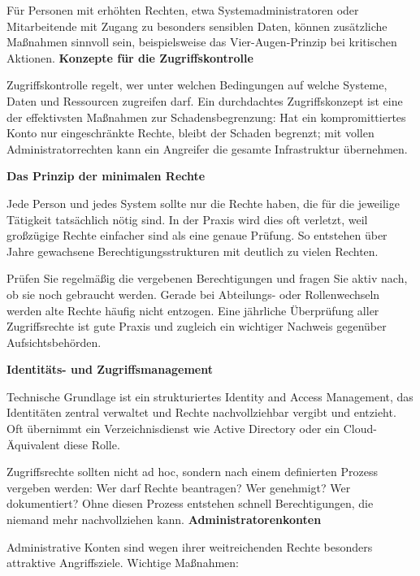 Für Personen mit erhöhten Rechten, etwa Systemadministratoren oder Mitarbeitende mit Zugang zu besonders sensiblen Daten, können zusätzliche Maßnahmen sinnvoll sein, beispielsweise das Vier-Augen-Prinzip bei kritischen Aktionen.
\newpage
\textbf{Konzepte für die Zugriffskontrolle}

Zugriffskontrolle regelt, wer unter welchen Bedingungen auf welche Systeme, Daten und Ressourcen zugreifen darf. Ein durchdachtes Zugriffskonzept ist eine der effektivsten Maßnahmen zur Schadensbegrenzung: Hat ein kompromittiertes Konto nur eingeschränkte Rechte, bleibt der Schaden begrenzt; mit vollen Administratorrechten kann ein Angreifer die gesamte Infrastruktur übernehmen.

\textbf{Das Prinzip der minimalen Rechte}

Jede Person und jedes System sollte nur die Rechte haben, die für die jeweilige Tätigkeit tatsächlich nötig sind. In der Praxis wird dies oft verletzt, weil großzügige Rechte einfacher sind als eine genaue Prüfung. So entstehen über Jahre gewachsene Berechtigungsstrukturen mit deutlich zu vielen Rechten.

Prüfen Sie regelmäßig die vergebenen Berechtigungen und fragen Sie aktiv nach, ob sie noch gebraucht werden. Gerade bei Abteilungs- oder Rollenwechseln werden alte Rechte häufig nicht entzogen. Eine jährliche Überprüfung aller Zugriffsrechte ist gute Praxis und zugleich ein wichtiger Nachweis gegenüber Aufsichtsbehörden.

\textbf{Identitäts- und Zugriffsmanagement}

Technische Grundlage ist ein strukturiertes Identity and Access Management, das Identitäten zentral verwaltet und Rechte nachvollziehbar vergibt und entzieht. Oft übernimmt ein Verzeichnisdienst wie Active Directory oder ein Cloud-Äquivalent diese Rolle.

Zugriffsrechte sollten nicht ad hoc, sondern nach einem definierten Prozess vergeben werden: Wer darf Rechte beantragen? Wer genehmigt? Wer dokumentiert? Ohne diesen Prozess entstehen schnell Berechtigungen, die niemand mehr nachvollziehen kann.
\newpage
\textbf{Administratorenkonten}

Administrative Konten sind wegen ihrer weitreichenden Rechte besonders attraktive Angriffsziele. Wichtige Maßnahmen:

